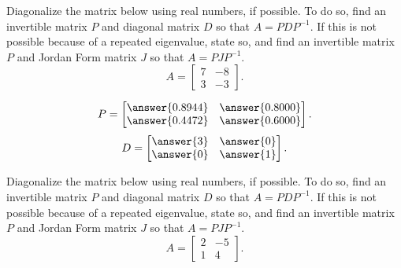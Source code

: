 \documentclass{ximera}
\begin{document}
\begin{exercise}%
    Diagonalize the matrix below using real numbers, if possible. To do so, find an invertible matrix $P$ and diagonal matrix $D$ so that $A = PDP^{-1}$. If this is not possible because of a repeated eigenvalue, state so, and find an invertible matrix $P$ and Jordan Form matrix $J$ so that $A = PJP^{-1}$. 
    \[ 
        A = 
        \begin{bmatrix} 
            7 & -8 \\ 
            3 & -3 
        \end{bmatrix}.
    \]
    \begin{multipleChoice}
    \end{multipleChoice}
    \begin{problem}
        \[ 
            P = 
            \begin{bmatrix} 
                \answer{0.8944} & \answer{0.8000} \\  
                \answer{0.4472} & \answer{0.6000}
            \end{bmatrix}.
        \]
        \[ 
            D = 
            \begin{bmatrix} 
                \answer{3} & \answer{0} \\  
                \answer{0} & \answer{1}
            \end{bmatrix}.
        \]
    \end{problem}
\end{exercise} 

\begin{exercise}%
    Diagonalize the matrix below using real numbers, if possible. To do so, find an invertible matrix $P$ and diagonal matrix $D$ so that $A = PDP^{-1}$. If this is not possible because of a repeated eigenvalue, state so, and find an invertible matrix $P$ and Jordan Form matrix $J$ so that $A = PJP^{-1}$. 
    \[ 
        A = 
        \begin{bmatrix} 
            2 & -5 \\ 
            1 & 4 
        \end{bmatrix}.
    \]
    \begin{multipleChoice}
    \end{multipleChoice}
\end{exercise} 
\end{document}
